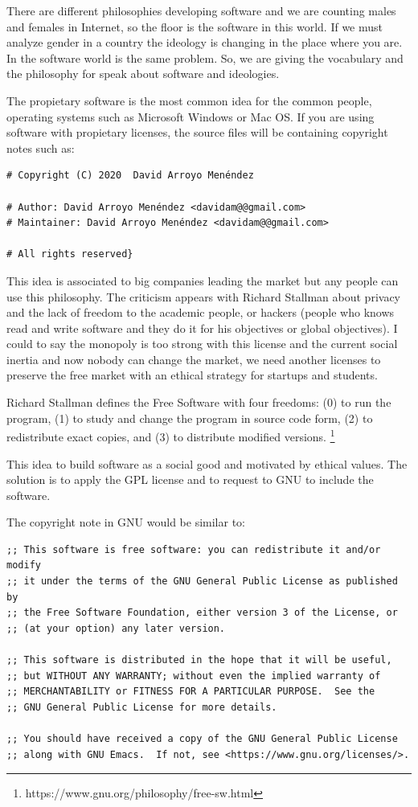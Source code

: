 \documentclass[fleqn,10pt,lineno]{wlpeerj} %
\begin{document}
There are different philosophies developing software and we are
counting males and females in Internet, so the floor is the software
in this world. If we must analyze gender in a country the ideology is
changing in the place where you are. In the software world is the same
problem. So, we are giving the vocabulary and the philosophy for speak
about software and ideologies.

The propietary software is the most common idea for the common people,
operating systems such as Microsoft Windows or Mac OS. If you are
using software with propietary licenses, the source files will be
containing copyright notes such as:

\begin{verbatim}
# Copyright (C) 2020  David Arroyo Menéndez

# Author: David Arroyo Menéndez <davidam@@gmail.com>
# Maintainer: David Arroyo Menéndez <davidam@@gmail.com>

# All rights reserved}
\end{verbatim}

This idea is associated to big companies leading the market but any
people can use this philosophy. The criticism appears with Richard
Stallman about privacy and the lack of freedom to the academic people,
or hackers (people who knows read and write software and they do it
for his objectives or global objectives). I could to say the monopoly
is too strong with this license and the current social inertia and now
nobody can change the market, we need another licenses to preserve the
free market with an ethical strategy for startups and students.

Richard Stallman defines the Free Software with four freedoms: (0) to
run the program, (1) to study and change the program in source code
form, (2) to redistribute exact copies, and (3) to distribute modified
versions. \footnote{https://www.gnu.org/philosophy/free-sw.html}

This idea to build software as a social good and motivated by ethical
values. The solution is to apply the GPL license and to request to GNU
to include the software.

The copyright note in GNU would be similar to:

\begin{verbatim}
;; This software is free software: you can redistribute it and/or modify
;; it under the terms of the GNU General Public License as published by
;; the Free Software Foundation, either version 3 of the License, or
;; (at your option) any later version.

;; This software is distributed in the hope that it will be useful,
;; but WITHOUT ANY WARRANTY; without even the implied warranty of
;; MERCHANTABILITY or FITNESS FOR A PARTICULAR PURPOSE.  See the
;; GNU General Public License for more details.

;; You should have received a copy of the GNU General Public License
;; along with GNU Emacs.  If not, see <https://www.gnu.org/licenses/>.
\end{verbatim}
\end{document}
